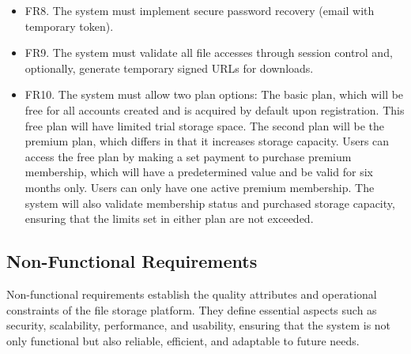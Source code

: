 \begin{itemize}
    \item FR8. The system must implement secure password recovery (email with temporary token).
    \item FR9. The system must validate all file accesses through session control and, optionally, generate temporary signed URLs for downloads.
    \item FR10. The system must allow two plan options: The basic plan, which will be free for all accounts created and is acquired by default upon registration. This free plan will have limited trial storage space. The second plan will be the premium plan, which differs in that it increases storage capacity. Users can access the free plan by making a set payment to purchase premium membership, which will have a predetermined value and be valid for six months only. Users can only have one active premium membership. The system will also validate membership status and purchased storage capacity, ensuring that the limits set in either plan are not exceeded.
\end{itemize}
\subsection{Non-Functional Requirements}
Non-functional requirements establish the quality attributes and operational constraints of the file storage platform. They define essential aspects such as security, scalability, performance, and usability, ensuring that the system is not only functional but also reliable, efficient, and adaptable to future needs.

